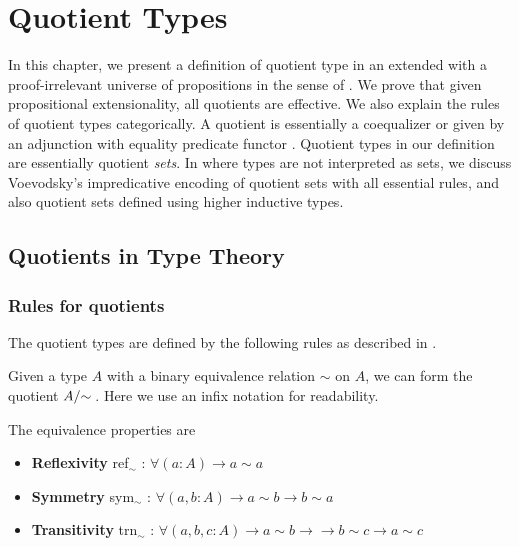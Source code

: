 \chapter{Quotient Types}
\label{qt}




In this chapter, we present a definition of quotient type in an \itt extended with a proof-irrelevant universe of propositions in the sense of . We prove that given propositional extensionality, all quotients are effective. We also explain the rules of quotient types categorically. A quotient is essentially a coequalizer or given by an adjunction with equality predicate functor \cite{Jacobs94quotientsin}. 
Quotient types in our definition are essentially quotient \emph{sets}. In \hott where types are not interpreted as sets, we discuss Voevodsky's impredicative encoding of quotient sets with all essential rules, and also quotient sets defined using higher inductive types. 

\section{Quotients in Type Theory}

\subsection{Rules for quotients}\label{iqs}

The quotient types are defined by the following rules as described in \cite{Jacobs94quotientsin,hof:95:sm}. 


{\Gamma \vdash {}}

Given a type $A$ with a binary equivalence relation $\sim$ on $A$, we can form the quotient $\qset{A}$. Here we use an infix notation for readability.

The equivalence properties are

\begin{itemize}
\item \textbf{Reflexivity} ref$_{\sim}$ : $\forall (a : A) \to a \sim a$
\item \textbf{Symmetry} sym$_{\sim}$ : $\forall (a,b : A) \to a \sim b \to b \sim a$
\item \textbf{Transitivity} trn$_{\sim}$ : $\forall (a,b,c : A) \to a \sim b \to \to b \sim c \to a \sim c$
\end{itemize}

